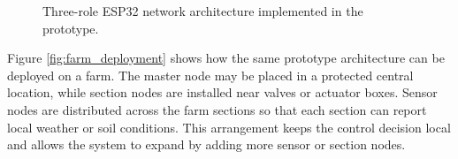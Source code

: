 \documentclass[12pt,a4paper]{report}
\begin{document}
\begin{figure}[H]
	\centering
	\caption{Three-role ESP32 network architecture implemented in the prototype.}
	\label{fig:architecture}
\end{figure}

Figure \ref{fig:farm_deployment} shows how the same prototype architecture can be deployed on a farm. The master node may be placed in a protected central location, while section nodes are installed near valves or actuator boxes. Sensor nodes are distributed across the farm sections so that each section can report local weather or soil conditions. This arrangement keeps the control decision local and allows the system to expand by adding more sensor or section nodes.
\end{document}
